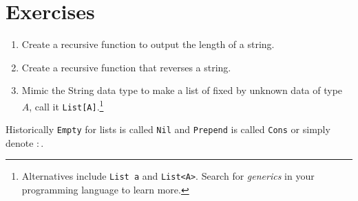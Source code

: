 
\section*{Exercises}

\begin{enumerate}
    \item Create a recursive function to output the length of a string.
    \item Create a recursive function that reverses a string.

    \item Mimic the String data type to make a list of fixed by 
    unknown data of type $A$, call it \lstinline{List[A]}.\footnote{
    Alternatives include \lstinline{List a} and \lstinline{List<A>}. 
    Search for \emph{generics} in your programming language to learn more.
    }

\end{enumerate}
Historically \lstinline{Empty} for lists is called \lstinline{Nil} 
and \lstinline{Prepend} is called \lstinline{Cons} or simply denote $:$.
